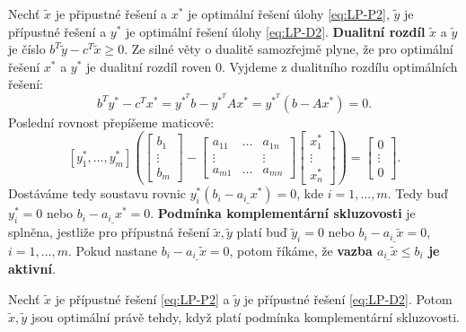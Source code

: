 Nechť $\tilde{x}$ je připustné řešení a $x^*$ je optimální řešení úlohy \ref{eq:LP-P2}, $\tilde{y}$ je přípustné řešení a $y^*$ je optimální řešení úlohy \ref{eq:LP-D2}. \textbf{Dualitní rozdíl} $\tilde{x}$ a $\tilde{y}$ je číslo $b^T \tilde{y} - c^T \tilde{x} \geq 0$. Ze silné věty o dualitě samozřejmě plyne, že pro optimální řešení $x^*$ a $y^*$ je dualitní rozdíl roven $0$. Vyjdeme z dualitního rozdílu optimálních řešení:
$$
    b^T y^* - c^T x^* = y^{*^T} b - y^{*^T} A x^* = y^{*^T} \left( b - A x^* \right) = 0.
$$
Poslední rovnost přepíšeme maticově:
$$
    \left[ y_1^*, \dots, y_m^* \right] \left(
        \begin{bmatrix}
            b_1    \\
            \vdots \\
            b_m
        \end{bmatrix}
        -
        \begin{bmatrix}
            a_{11} & \dots & a_{1n} \\
            \vdots & \     & \vdots \\
            a_{m1} & \dots & a_{mn}
        \end{bmatrix}
        \begin{bmatrix}
            x_1^*  \\
            \vdots \\
            x_n^*
        \end{bmatrix}
    \right)
    =
    \begin{bmatrix}
    0      \\
    \vdots \\
    0
    \end{bmatrix}.
$$
Dostáváme tedy soustavu rovnic $y_i^* \left( b_i - a_{i\_} x^* \right) = 0$, kde $i = 1, \dots, m$. Tedy buď $y_i^* = 0$ nebo $ b_i - a_{i\_} x^* = 0$. \textbf{Podmínka komplementární skluzovosti} je splněna, jestliže pro přípustná řešení $\tilde{x}, \tilde{y}$ platí buď $\tilde{y}_i = 0$ nebo $b_i - a_{i\_} \tilde{x} = 0$, $i = 1, \dots, m$. Pokud nastane $b_i - a_{i\_} \tilde{x} = 0$, potom říkáme, že \textbf{vazba $a_{i\_} \tilde{x} \leq b_i$ je aktivní}.

\begin{vt}
    Nechť $\tilde{x}$ je přípustné řešení \ref{eq:LP-P2} a $\tilde{y}$ je přípustné řešení \ref{eq:LP-D2}. Potom $\tilde{x}, \tilde{y}$ jsou optimální právě tehdy, když platí podmínka komplementární skluzovosti.
\end{vt}

